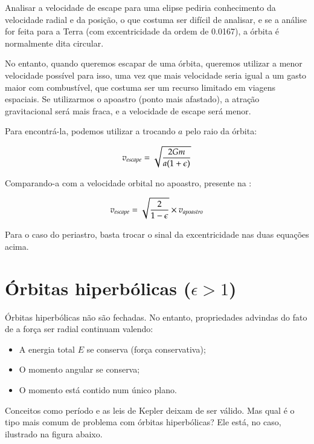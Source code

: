Analisar a velocidade de escape para uma elipse pediria conhecimento da velocidade radial e da posição, o que costuma ser difícil de analisar, e se a análise for feita para a Terra (com excentricidade da ordem de 0.0167), a órbita é normalmente dita circular. {\\}

No entanto, quando queremos escapar de uma órbita, queremos utilizar a menor velocidade possível para isso, uma vez que mais velocidade seria igual a um gasto maior com combustível, que costuma ser um recurso limitado em viagens espaciais. Se utilizarmos o apoastro (ponto mais afastado), a atração gravitacional será mais fraca, e a velocidade de escape será menor.{\\}

Para encontrá-la, podemos utilizar a  trocando $a$ pelo raio da órbita:

\begin{equation}
	v_{escape} = \sqrt{\frac{2Gm}{a(1+\epsilon)}}						\label{eq82}
\end{equation}

Comparando-a com a velocidade orbital no apoastro, presente na :

\begin{equation}
	v_{escape} = \sqrt{\frac{2}{1-\epsilon}} \times v_{apoastro}		\label{eq83}
\end{equation}

Para o caso do periastro, basta trocar o sinal da excentricidade nas duas equações acima.

\newpage

\section{Órbitas hiperbólicas ($\epsilon > 1$)}

Órbitas hiperbólicas não são fechadas. No entanto, propriedades advindas do fato de a força ser radial continuam valendo:

\begin{itemize}
	\item A energia total $E$ se conserva (força conservativa);
	\item O momento angular se conserva;
	\item O momento está contido num único plano.
\end{itemize}

Conceitos como período e as leis de Kepler deixam de ser válido. Mas qual é o tipo mais comum de problema com órbitas hiperbólicas? Ele está, no caso, ilustrado na figura abaixo.

